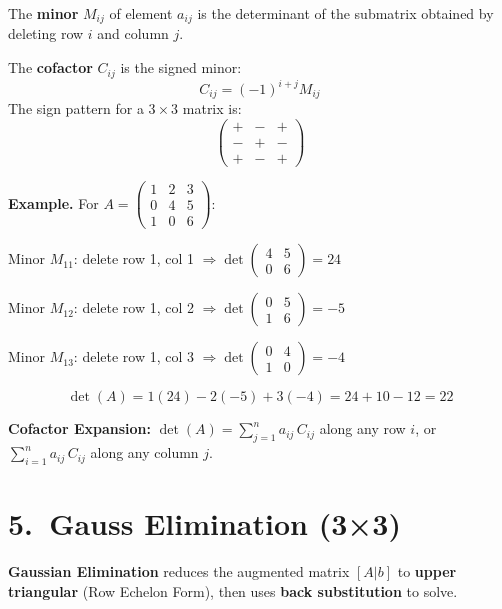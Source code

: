 \documentclass[12pt]{article}
\begin{document}
\begin{defbox}[Minor]
The \textbf{minor} $M_{ij}$ of element $a_{ij}$ is the determinant of the submatrix obtained by deleting row $i$ and column $j$.
\end{defbox}

\begin{defbox}[Cofactor]
The \textbf{cofactor} $C_{ij}$ is the signed minor:
\[
C_{ij} = (-1)^{i+j} M_{ij}
\]
The sign pattern for a $3\times3$ matrix is:
\[
\begin{pmatrix}+&-&+\\-&+&-\\+&-&+\end{pmatrix}
\]
\end{defbox}

\textbf{Example.} For $A = \begin{pmatrix}1&2&3\\0&4&5\\1&0&6\end{pmatrix}$:

Minor $M_{11}$: delete row 1, col 1 $\Rightarrow \det\begin{pmatrix}4&5\\0&6\end{pmatrix} = 24$

Minor $M_{12}$: delete row 1, col 2 $\Rightarrow \det\begin{pmatrix}0&5\\1&6\end{pmatrix} = -5$

Minor $M_{13}$: delete row 1, col 3 $\Rightarrow \det\begin{pmatrix}0&4\\1&0\end{pmatrix} = -4$

\[
\det(A) = 1(24) - 2(-5) + 3(-4) = 24 + 10 - 12 = 22
\]

\begin{keybox}
\textbf{Cofactor Expansion:} $\det(A) = \sum_{j=1}^{n} a_{ij}\,C_{ij}$ along any row $i$, or $\sum_{i=1}^{n} a_{ij}\,C_{ij}$ along any column $j$.
\end{keybox}

\section{5.\ Gauss Elimination (3×3)}

\begin{defbox}
\textbf{Gaussian Elimination} reduces the augmented matrix $[A|b]$ to \textbf{upper triangular} (Row Echelon Form), then uses \textbf{back substitution} to solve.
\end{defbox}
\end{document}

